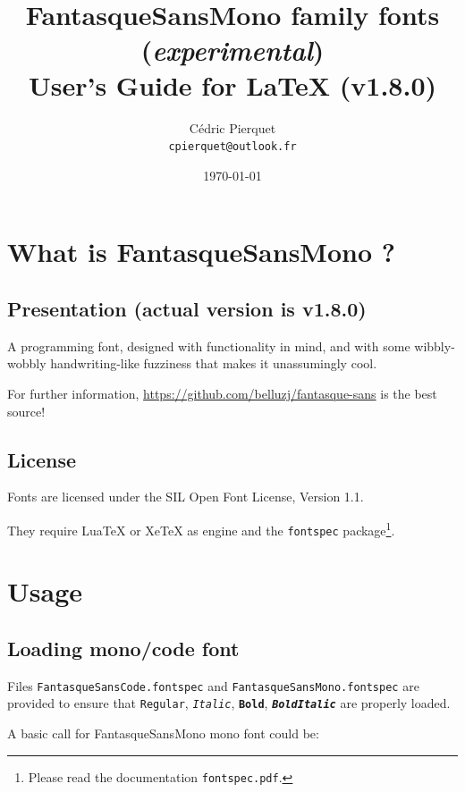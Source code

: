 \documentclass[a4paper]{scrartcl}
\title{FantasqueSansMono family fonts (\textit{experimental}) \\User’s Guide for LaTeX (v1.8.0)}
\author{Cédric Pierquet \\ \texttt{cpierquet@outlook.fr}}
\date{\today}
\newcommand*{\pkg}[1]{\texttt{#1}}
\newcommand*{\file}[1]{\texttt{#1}}
\begin{document}
\maketitle

\section{What is FantasqueSansMono ?}

\subsection{Presentation (actual version is v1.8.0)}

A programming font, designed with functionality in mind, and with some wibbly-wobbly handwriting-like fuzziness that makes it unassumingly cool.

\medskip

For further information, \url{https://github.com/belluzj/fantasque-sans} is the best source!

\subsection{License}

Fonts are licensed under the SIL Open Font License, Version 1.1.

They require LuaTeX or XeTeX as engine and the \pkg{fontspec} package\footnote{Please read the documentation \file{fontspec.pdf}.}.

\pagebreak

\section{Usage}

\subsection{Loading mono/code font}

Files \file{FantasqueSansCode.fontspec} and \file{FantasqueSansMono.fontspec} are provided to ensure that \texttt{Regular}, \texttt{\textit{Italic}}, \texttt{\textbf{Bold}}, \texttt{\textit{\textbf{BoldItalic}}} are properly loaded.

\smallskip

A basic call for FantasqueSansMono mono font could be:

\begin{codeblock}[minted language=latex, title=Loading]
\usepackage{fantasquesansmono-otf}
\end{codeblock}
\end{document}
